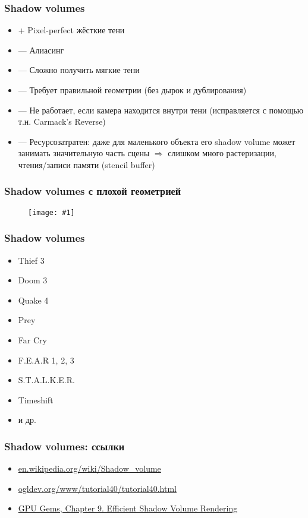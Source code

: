 \documentclass{beamer}
\newcommand{\slideimage}[1]{
  \begin{figure}
    \begin{adjustbox}{width=\textwidth, totalheight=\textheight-2\baselineskip-2\baselineskip,keepaspectratio}
      \texttt{[image: \#1]}
    \end{adjustbox}
  \end{figure}
}
\begin{document}
\begin{frame}[fragile]
\frametitle{Shadow volumes}
\begin{itemize}
\item {\color{green}+} Pixel-perfect жёсткие тени
\item {\color{red}---} Алиасинг
\item {\color{red}---} Сложно получить мягкие тени
\item {\color{red}---} Требует правильной геометрии (без дырок и дублирования)
\item {\color{red}---} Не работает, если камера находится внутри тени (исправляется с помощью т.н. Carmack's Reverse)
\item {\color{red}---} Ресурсозатратен: даже для маленького объекта его shadow volume может занимать значительную часть сцены \begin{math}\Rightarrow\end{math} слишком много растеризации, чтения/записи памяти (stencil buffer)
\end{itemize}
\end{frame}

\begin{frame}[fragile]
\frametitle{Shadow volumes с плохой геометрией}
\slideimage{shadow-volume-bad-mesh.jpg}
\end{frame}

\begin{frame}[fragile]
\frametitle{Shadow volumes}
\begin{itemize}
\item Thief 3
\item Doom 3
\item Quake 4
\item Prey
\item Far Cry
\item F.E.A.R 1, 2, 3
\item S.T.A.L.K.E.R.
\item Timeshift
\item и др.
\end{itemize}
\end{frame}

\begin{frame}[fragile]
\frametitle{Shadow volumes: ссылки}
\begin{itemize}
\item \href{https://en.wikipedia.org/wiki/Shadow_volume}{en.wikipedia.org/wiki/Shadow\_volume}
\item \href{https://ogldev.org/www/tutorial40/tutorial40.html}{ogldev.org/www/tutorial40/tutorial40.html}
\item \href{https://developer.download.nvidia.com/books/HTML/gpugems/gpugems_ch09.html}{GPU Gems, Chapter 9. Efficient Shadow Volume Rendering}
\end{itemize}
\end{frame}
\end{document}
